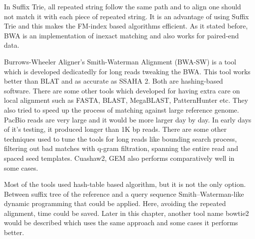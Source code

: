 \documentclass{standalone}
\begin{document}
In Suffix Trie, all repeated string follow the same path and to align one should not match it with each piece of repeated string. It is an advantage of using Suffix Trie\cite{BWA_short} and this makes the FM-index based algorithms efficient. As it stated before, BWA is an implementation of inexact matching and also works for paired-end data.
 
Burrows-Wheeler Aligner's Smith-Waterman Alignment (BWA-SW)\cite{BWA_long} is a tool which is developed dedicatedly for long reads tweaking the BWA. This tool works better than BLAT\cite{BLAT} and as accurate as SSAHA 2\cite{SSAHA}. Both are hashing-based software.  There are some other tools which developed for having extra care on local alignment such as FASTA\cite{FASTA}, BLAST\cite{BLAST}, MegaBLAST\cite{MegaBLAST2,MegaBLAST}, PatternHunter\cite{PatternHunter} etc. They also tried to speed up the process of matching against large reference genome. PacBio reads are very large and it would be more larger day by day. In early days of it's testing, it produced longer than 1K bp reads\cite{pacBioReadLength}. There are some other techniques used to tune the tools for long reads like bounding search process\cite{BWA_short}, filtering out bad matches with q-gram filtration\cite{SHRIMP,RazerS}, spanning the entire read\cite{RMAP,ZOOM,SeqMap} and spaced seed templates\cite{PatternHunter}. Cuashaw2\cite{Cushaw2}, GEM\cite{GEM} also performs comparatively well in some cases.

Most of the tools used hash-table based algorithm, but it is not the only option. Between suffix tree of the reference and a query sequence Smith--Waterman-like dynamic programming that could be applied\cite{alterHashTable}. Here, avoiding the repeated alignment, time could be saved. Later in this chapter, another tool name bowtie2\cite{bowtie2} would be described which uses the same approach and some cases it performs better. 
\end{document}
